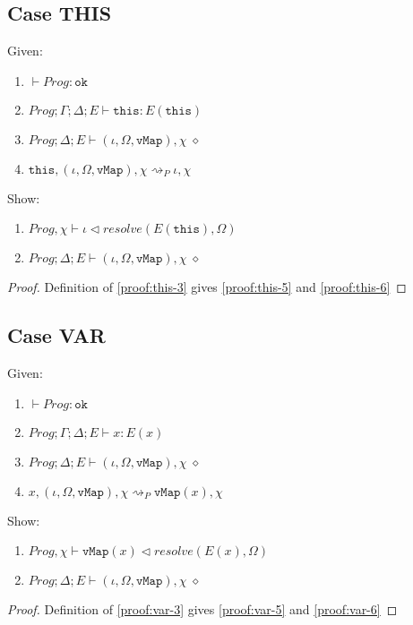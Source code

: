 \subsection{Case THIS}

Given:
\begin{enumerate}[label=\arabic*)]
    \item $\vdash Prog : \texttt{ok}$
    \item $Prog; \Gamma; \Delta; E \vdash \texttt{this} : E(\texttt{this})$
    \item \label{proof:this-3} $Prog; \Delta; E \vdash (\iota, \Omega, \texttt{vMap}), \chi \; \diamond$
    \item $\texttt{this}, (\iota, \Omega, \texttt{vMap}), \chi \rightsquigarrow_P \iota, \chi $
\end{enumerate}
Show:
\begin{enumerate}[label=\arabic*), resume]
    \item \label{proof:this-5} $Prog, \chi \vdash \iota \triangleleft resolve(E(\texttt{this}), \Omega)$
    \item \label{proof:this-6} $Prog; \Delta; E \vdash (\iota, \Omega, \texttt{vMap}), \chi \; \diamond$
\end{enumerate}
\begin{proof}
Definition of \ref{proof:this-3} gives \ref{proof:this-5} and \ref{proof:this-6}
\end{proof}

\subsection{Case VAR}

Given:
\begin{enumerate}[label=\arabic*)]
    \item $\vdash Prog : \texttt{ok}$
    \item $Prog; \Gamma; \Delta; E \vdash x : E(x)$
    \item \label{proof:var-3} $Prog; \Delta; E \vdash (\iota, \Omega, \texttt{vMap}), \chi \; \diamond$
    \item $x, (\iota, \Omega, \texttt{vMap}), \chi \rightsquigarrow_P \texttt{vMap}(x), \chi $
\end{enumerate}
Show:
\begin{enumerate}[label=\arabic*), resume]
    \item \label{proof:var-5} $Prog, \chi \vdash \texttt{vMap}(x) \triangleleft resolve(E(x), \Omega)$
    \item \label{proof:var-6} $Prog; \Delta; E \vdash (\iota, \Omega, \texttt{vMap}), \chi \; \diamond$
\end{enumerate}
\begin{proof}
Definition of \ref{proof:var-3} gives \ref{proof:var-5} and \ref{proof:var-6}
\end{proof}

